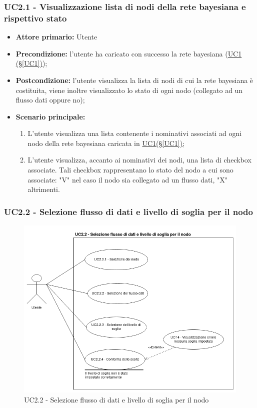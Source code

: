 \subsubsection{UC2.1 - Visualizzazione lista di nodi della rete bayesiana e rispettivo stato}\label{UC2.1}
\begin{itemize}
\item \textbf{Attore primario:}  Utente
\item \textbf{Precondizione:} l'utente ha caricato con successo la rete bayesiana (\hyperref[UC1]{UC1 									(§\ref*{UC1})});
\item \textbf{Postcondizione:} l'utente visualizza la lista di nodi di cui la rete bayesiana è costituita, viene 			inoltre visualizzato lo stato di ogni nodo (collegato ad un flusso dati oppure no);
\item \textbf{Scenario principale:}
	\begin{enumerate}
	\item L'utente visualizza una lista contenente i nominativi associati ad ogni nodo della rete bayesiana caricata 				in \hyperref[UC1]{UC1(§\ref*{UC1})};
	\item L'utente visualizza, accanto ai nominativi dei nodi, una lista di checkbox associate. Tali checkbox 							rappresentano lo stato del nodo a cui sono associate: "V" nel caso il nodo sia collegato ad un flusso dati, "X" 		altrimenti.
	\end{enumerate}
\end{itemize}

\pagebreak

\subsubsection{UC2.2 - Selezione flusso di dati e livello di soglia per il nodo}\label{UC2.2}

\begin{figure}[H]
\centering
\includegraphics[scale=0.5]{./images/UC2-2.png}
\caption{UC2.2 - Selezione flusso di dati e livello di soglia per il nodo}
\end{figure}

